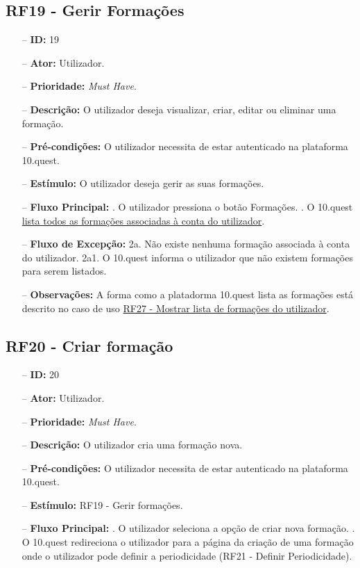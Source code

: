 \subsection{RF19 - Gerir Formações}
\begin{itemize}
	\item[--] \textbf{ID:} 19
	\item[--]  \textbf{Ator:} Utilizador.
	\item[--]  \textbf{Prioridade:} \textit{Must Have}.
	\item[--]  \textbf{Descrição:} O utilizador deseja visualizar, criar, editar ou eliminar uma formação.
	\item[--]  \textbf{Pré-condições:} O utilizador necessita de estar autenticado na plataforma 10.quest.
	\item[--]  \textbf{Estímulo:} O utilizador deseja gerir as suas formações.
	\item[--]  \textbf{Fluxo Principal:} 
	. O utilizador pressiona o botão Formações.
	. O 10.quest  \underline{lista todos as formações associadas à conta do utilizador}.
	\item[--]  \textbf{Fluxo de Excepção:} 
	\subitem 2a. Não existe nenhuma formação associada à conta do utilizador.
	\subitem 2a1. O 10.quest informa o utilizador que não existem formações para serem listados.
	\item[--]  \textbf{Observações:} A forma como a platadorma 10.quest lista as formações está descrito no caso de uso \underline{RF27 - Mostrar lista de formações do utilizador}.
\end{itemize}
\newpage

\subsection{RF20 - Criar formação}
\begin{itemize}
	\item[--] \textbf{ID:} 20
	\item[--]  \textbf{Ator:} Utilizador.
	\item[--]  \textbf{Prioridade:} \textit{Must Have}.
	\item[--]  \textbf{Descrição:} O utilizador cria uma formação nova.
	\item[--]  \textbf{Pré-condições:} O utilizador necessita de estar autenticado na plataforma 10.quest.
	\item[--]  \textbf{Estímulo:} RF19 - Gerir formações.
	\item[--]  \textbf{Fluxo Principal:} 
		. O utilizador seleciona a opção de criar nova formação.
		. O 10.quest redireciona o utilizador para a página da criação de uma formação onde o utilizador pode definir a periodicidade (RF21 - Definir Periodicidade).
\end{itemize}
\newpage

